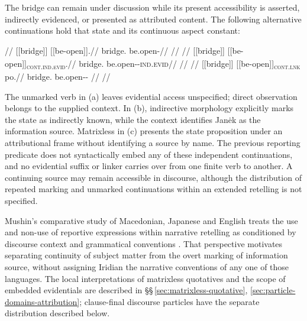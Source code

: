 The bridge can remain under discussion while its present accessibility
is asserted, indirectly evidenced, or presented as attributed content.
The following alternative continuations hold that state and its
continuous aspect constant:

\pex\label{ex:disc-reportative-continuations}
\a
\begingl
\glpreamble {}//
\gla \textnormal{[[bridge]]}\textsubscript{\Dir{}} \textnormal{[[be-open]]}\textsubscript{\Cont{}}.//
\glb bridge.\Dir{} be.open-\Cont{}//
\glft {}//
\endgl
\a
\begingl
\glpreamble {}//
\gla \textnormal{[[bridge]]}\textsubscript{\Dir{}} \textnormal{[[be-open]]}\textsubscript{\textsc{cont.ind.evid}}.//
\glb bridge.\Dir{} be.open-\Cont{}-\textsc{ind.evid}//
\glft {}//
\endgl
\a
\begingl
\glpreamble {}//
\gla \textnormal{[[bridge]]}\textsubscript{\Dir{}} \textnormal{[[be-open]]}\textsubscript{\textsc{cont.lnk}} po.//
\glb bridge.\Dir{} be.open-\Cont{}-\Lnk{} \Compl{}//
\glft {}//
\endgl
\xe

The unmarked verb in (a) leaves evidential access unspecified; direct
observation belongs to the supplied context. In (b), indirective
morphology explicitly marks the state as indirectly known, while the
context identifies Janėk as the information source. Matrixless
 in (c) presents the state proposition under an attributional
frame without identifying a source by name. The previous reporting
predicate does not syntactically embed any of these independent
continuations, and no evidential suffix or linker carries over from
one finite verb to another. A continuing source may remain accessible
in discourse, although the distribution of repeated marking and
unmarked continuations within an extended retelling is not specified.

Mushin's comparative study of Macedonian, Japanese and English treats
the use and non-use of reportive expressions within narrative retelling
as conditioned by discourse context and grammatical conventions
\cite{mushin2001}. That perspective motivates separating continuity of
subject matter from the overt marking of information source, without
assigning Iridian the narrative conventions of any one of those languages.
The local interpretations of matrixless quotatives and the scope of
embedded evidentials are described in
§§\,\ref{sec:matrixless-quotative},
\ref{sec:particle-domains-attribution}; clause-final discourse particles
have the separate distribution described below.

